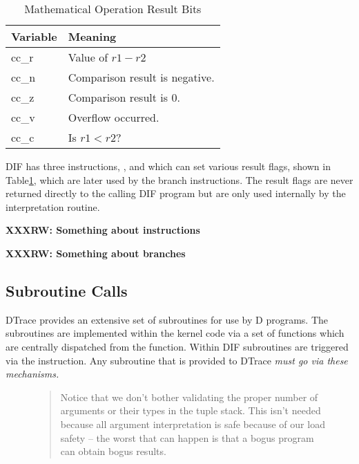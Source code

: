 \begin{table}
  \centering
    \begin{tabular}{|l|l|}
      \hline
      Variable & Meaning\\
      \hline
      cc\_r & Value of $r1 - r2$\\
      cc\_n & Comparison result is negative. \\
      cc\_z & Comparison result is 0.\\
      cc\_v & Overflow occurred.\\
      cc\_c & Is $r1 < r2$?\\
      \hline
  \end{tabular}
\label{tbl:cmp-vars}
\caption{Mathematical Operation Result Bits}
\end{table}

DIF has three instructions, ,  and
 which can set various result flags, shown in
Table\ref{tbl:cmp-vars}, which are later used by the branch
instructions.  The result flags are never returned directly to the
calling DIF program but are only used internally by the interpretation
routine.

\textbf{XXXRW: Something about instructions}

\textbf{XXXRW: Something about branches}

\subsection{Subroutine Calls}
\label{sec:subroutines}

DTrace provides an extensive set of subroutines for use by D
programs.  The subroutines are implemented within the kernel code via
a set of functions which are centrally dispatched from the
 function.  Within DIF subroutines are
triggered via the  instruction.  Any subroutine that
is provided to DTrace \em{must} go via these mechanisms.

\begin{figure}
\begin{quote}
  Notice that we don't bother validating the proper number of
  arguments or their types in the tuple stack.  This isn't needed
  because all argument interpretation is safe because of our load
  safety -- the worst that can happen is that a bogus program can
  obtain bogus results.
\end{quote}
\label{fig:argcheck}
\end{figure}

